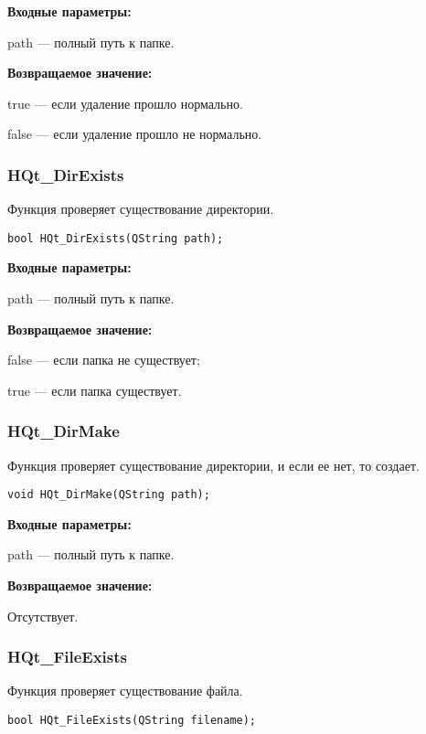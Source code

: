 \documentclass[a4paper,12pt]{article}
\begin{document}
\textbf{Входные параметры:}

path --- полный путь к папке.

\textbf{Возвращаемое значение:}

true --- если удаление прошло нормально.

false ---  если удаление прошло не нормально.


\subsubsection{HQt\_DirExists}\label{HQt_DirExists}

Функция проверяет существование директории.


\begin{lstlisting}[label=code_syntax_HQt_DirExists,caption=Синтаксис]
bool HQt_DirExists(QString path);
\end{lstlisting}

\textbf{Входные параметры:}

path --- полный путь к папке.

\textbf{Возвращаемое значение:}

false --- если папка не существует;

true --- если папка существует.


\subsubsection{HQt\_DirMake}\label{HQt_DirMake}

Функция проверяет существование директории, и если ее нет, то создает.


\begin{lstlisting}[label=code_syntax_HQt_DirMake,caption=Синтаксис]
void HQt_DirMake(QString path);
\end{lstlisting}

\textbf{Входные параметры:}

path --- полный путь к папке.

\textbf{Возвращаемое значение:}

Отсутствует.


\subsubsection{HQt\_FileExists}\label{HQt_FileExists}

Функция проверяет существование файла.


\begin{lstlisting}[label=code_syntax_HQt_FileExists,caption=Синтаксис]
bool HQt_FileExists(QString filename);
\end{lstlisting}
\end{document}

